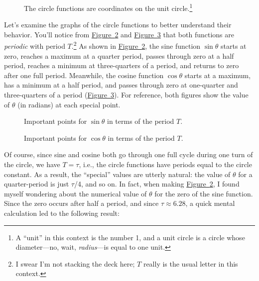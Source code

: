 \documentclass{article}
\begin{document}
\begin{figure}
\begin{center}
\end{center}
\caption{The circle functions are coordinates on the unit circle.\footnote{A ``unit'' in this context is the number 1, and a unit circle is a circle whose diameter---no, wait, \emph{radius}---is equal to one unit.}\label{fig:circle-functions}}
\end{figure}

Let's examine the graphs of the circle functions to better understand their behavior. You'll notice from \hyperref[fig:sine-with-tau]{Figure~}\ref{fig:sine-with-tau} and \hyperref[fig:cosine-with-tau]{Figure~}\ref{fig:cosine-with-tau} that both functions are \emph{periodic} with period $T$.\footnote{I swear I'm not stacking the deck here; $T$ really is the usual letter in this context.} As shown in \hyperref[fig:sine-with-tau]{Figure~}\ref{fig:sine-with-tau}, the sine function $\sin\theta$ starts at zero, reaches a maximum at a quarter period, passes through zero at a half period, reaches a minimum at three-quarters of a period, and returns to zero after one full period. Meanwhile, the cosine function $\cos\theta$ starts at a maximum, has a minimum at a half period, and passes through zero at one-quarter and three-quarters of a period  (\hyperref[fig:cosine-with-tau]{Figure~}\ref{fig:cosine-with-tau}). For reference, both figures show the value of $\theta$ (in radians) at each special point.

\begin{figure}
\begin{center}
\end{center}
\caption{Important points for $\sin\theta$ in terms of the period $T$.\label{fig:sine-with-tau}}
\end{figure}

\begin{figure}
\begin{center}
\end{center}
\caption{Important points for $\cos\theta$ in terms of the period $T$.\label{fig:cosine-with-tau}}
\end{figure}

Of course, since sine and cosine both go through one full cycle during one turn of the circle, we have $T = \tau$, i.e., the circle functions have periods equal to the circle constant. As a result, the ``special'' values are utterly natural: the value of $\theta$ for a quarter-period is just $\tau$/4, and so on. In fact, when making \hyperref[fig:sine-with-tau]{Figure~}\ref{fig:sine-with-tau}, I found myself wondering about the numerical value of $\theta$ for the zero of the sine function. Since the zero occurs after half a period, and since $\tau \approx 6.28$, a quick mental calculation led to the following result:
\end{document}
